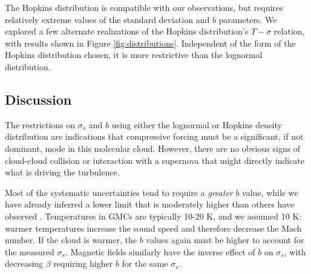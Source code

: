 The Hopkins distribution is compatible with our observations, but requires
relatively extreme values of the standard deviation and $b$ parameters.  
We explored a few alternate realizations of the Hopkins distribution's
$T-\sigma$ relation, with results shown in Figure \ref{fig:distributions}.
Independent of the form of the Hopkins distribution chosen, it is more
restrictive than the lognormal distribution.


% 
% 
% 

\subsection{Discussion}
The restrictions on $\sigma_s$ and $b$ using either the lognormal or Hopkins density
distribution are indications that compressive forcing must be a significant, if
not dominant, mode in this molecular cloud.  However, there are no obvious
signs of cloud-cloud collision or interaction with a supernova that might
directly indicate what is driving the turbulence.

Most of the systematic uncertainties tend to require a \emph{greater} $b$
value, while we have already inferred a lower limit
that is moderately higher than others have observed \citep{Brunt2010c,Kainulainen2013a}.
Temperatures in GMCs are typically 10-20 K, and we assumed 10 K: warmer
temperatures increase the sound speed and therefore decrease the Mach number. If
the cloud is warmer, the $b$ values again must be higher to account for the measured
$\sigma_s$.  Magnetic fields similarly have the inverse effect of $b$ on
$\sigma_s$, with decreasing $\beta$ requiring higher $b$ for the same
$\sigma_s$.

